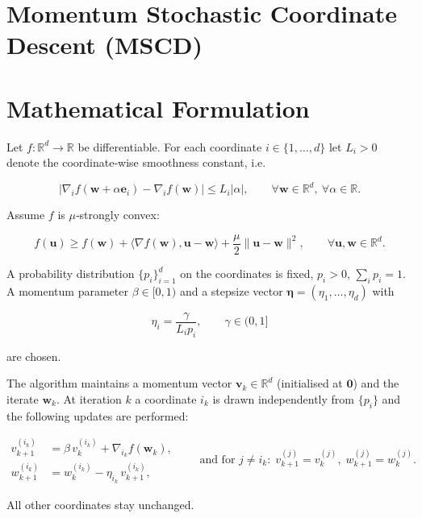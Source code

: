 \documentclass{article}
\newcommand{\R}{\mathbb{R}}
\begin{document}
\section*{Momentum Stochastic Coordinate Descent (MSCD)}

\section*{Mathematical Formulation}
Let $f:\R^{d}\to\R$ be differentiable.  
For each coordinate $i\in\{1,\dots ,d\}$ let $L_i>0$ denote the coordinate‑wise smoothness constant, i.e.  

\[
\big| \nabla_i f(\bm w + \alpha \bm e_i)-\nabla_i f(\bm w)\big| \le L_i |\alpha|,\qquad\forall \bm w\in\R^{d},\ \forall \alpha\in\R .
\tag{1}
\]

Assume $f$ is $\mu$‑strongly convex:

\[
f(\bm u)\ge f(\bm w)+\langle\nabla f(\bm w),\bm u-\bm w\rangle+\frac{\mu}{2}\|\bm u-\bm w\|^{2},
\qquad\forall \bm u,\bm w\in\R^{d}.
\tag{2}
\]

A probability distribution $\{p_i\}_{i=1}^{d}$ on the coordinates is fixed, $p_i>0$, $\sum_i p_i =1$.
A momentum parameter $\beta\in[0,1)$ and a stepsize vector $\bm\eta=(\eta_1,\dots ,\eta_d)$ with  

\[
\eta_i = \frac{\gamma}{L_i p_i},\qquad \gamma\in(0,1]
\tag{3}
\]

are chosen.  

The algorithm maintains a momentum vector $\bm v_k\in\R^{d}$ (initialised at $\bm 0$) and the iterate $\bm w_k$.  
At iteration $k$ a coordinate $i_k$ is drawn independently from $\{p_i\}$ and the following updates are performed:

\[
\boxed{
\begin{aligned}
v_{k+1}^{(i_k)} &= \beta\,v_{k}^{(i_k)} + \nabla_{i_k} f(\bm w_{k}),\\[4pt]
w_{k+1}^{(i_k)} &= w_{k}^{(i_k)} - \eta_{i_k}\, v_{k+1}^{(i_k)},
\end{aligned}}
\qquad
\text{and for }j\neq i_k:\; v_{k+1}^{(j)} = v_{k}^{(j)},\; w_{k+1}^{(j)} = w_{k}^{(j)} .
\tag{4}
\]

All other coordinates stay unchanged.
\end{document}
